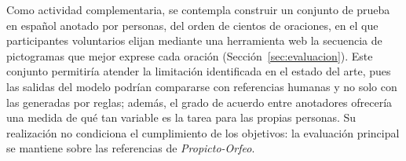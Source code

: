 Como actividad complementaria, se contempla construir un conjunto de prueba en español anotado por personas, del orden de cientos de oraciones, en el que participantes voluntarios elijan mediante una herramienta web la secuencia de pictogramas que mejor exprese cada oración (Sección~\ref{sec:evaluacion}). Este conjunto permitiría atender la limitación identificada en el estado del arte, pues las salidas del modelo podrían compararse con referencias humanas y no solo con las generadas por reglas; además, el grado de acuerdo entre anotadores ofrecería una medida de qué tan variable es la tarea para las propias personas. Su realización no condiciona el cumplimiento de los objetivos: la evaluación principal se mantiene sobre las referencias de \textit{Propicto-Orfeo}.
